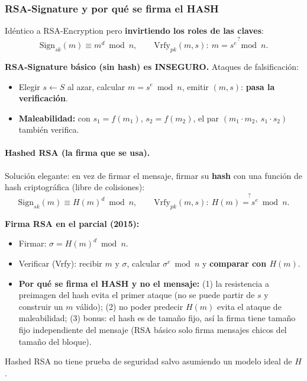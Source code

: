 \documentclass[../main.tex]{subfiles}
\begin{document}
\subsubsection{RSA-Signature y por qué se firma el HASH}

Idéntico a RSA-Encryption pero \textbf{invirtiendo los roles de las claves}:
\[ \mathrm{Sign}_{sk}(m)\equiv m^d \bmod n, \qquad
   \mathrm{Vrfy}_{pk}(m,s):\ \overset{?}{m=s^e \bmod n}. \]

\begin{ojo}
\textbf{RSA-Signature básico (sin hash) es INSEGURO.} Ataques de falsificación:
\begin{itemize}[leftmargin=1.4em,nosep]
  \item Elegir $s\leftarrow S$ al azar, calcular $m=s^e\bmod n$, emitir $(m,s)$:
  \textbf{pasa la verificación}.
  \item \textbf{Maleabilidad:} con $s_1=f(m_1)$, $s_2=f(m_2)$, el par
  $(m_1\!\cdot m_2,\ s_1\!\cdot s_2)$ también verifica.
\end{itemize}
\end{ojo}

\paragraph{Hashed RSA (la firma que se usa).} Solución elegante: en vez de firmar
el mensaje, firmar su \textbf{hash} con una función de hash criptográfica (libre de
colisiones):
\[ \mathrm{Sign}_{sk}(m)\equiv H(m)^d \bmod n, \qquad
   \mathrm{Vrfy}_{pk}(m,s):\ \overset{?}{H(m)=s^e \bmod n}. \]

\begin{examen}
\textbf{Firma RSA en el parcial (2015):}
\begin{itemize}[leftmargin=1.4em,nosep]
  \item Firmar: $\sigma=H(m)^d \bmod n$.
  \item Verificar (Vrfy): recibir $m$ y $\sigma$, calcular $\sigma^e \bmod n$ y
  \textbf{comparar con $H(m)$}.
  \item \textbf{Por qué se firma el HASH y no el mensaje:} (1) la resistencia a
  preimagen del hash evita el primer ataque (no se puede partir de $s$ y construir
  un $m$ válido); (2) no poder predecir $H(m)$ evita el ataque de maleabilidad;
  (3) bonus: el hash es de tamaño fijo, así la firma tiene tamaño fijo
  independiente del mensaje (RSA básico solo firma mensajes chicos del tamaño del
  bloque).
\end{itemize}
Hashed RSA no tiene prueba de seguridad salvo asumiendo un modelo ideal de $H$.
\end{examen}
\end{document}
